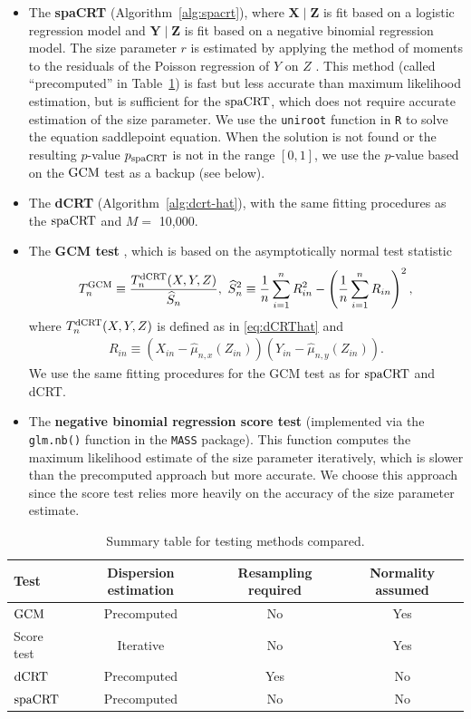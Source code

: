 \documentclass[12pt]{article}
\theoremstyle{definition}
\newcommand{\prx}{\bm X}								%
\newcommand{\srx}{X}									%
\newcommand{\prz}{\bm Z}								%
\newcommand{\srz}{Z}									%
\newcommand{\pry}{{\bm Y}}								%
\newcommand{\sry}{Y}									%
\newcommand{\dCRT}{\textnormal{dCRT}} 					%
\newcommand{\GCM}{\textnormal{GCM}}						%
\newcommand{\spacrt}{\textnormal{spaCRT}}               %
\begin{document}
\begin{itemize}
\item The \textbf{spaCRT} (Algorithm~\ref{alg:spacrt}), where $\prx \mid \prz$ is fit based on a logistic regression model and $\pry \mid \prz$ is fit based on a negative binomial regression model. The size parameter $r$ is estimated by applying the method of moments to the residuals of the Poisson regression of $Y$ on $Z$ \citep{Katsevich2020c,Barry2024}. This method (called ``precomputed'' in Table~\ref{tab:methodology_summary}) is fast but less accurate than maximum likelihood estimation, but is sufficient for the $\spacrt$, which does not require accurate estimation of the size parameter. We use the \texttt{uniroot} function in \texttt{R} to solve the equation saddlepoint equation. When the solution is not found or the resulting $p$-value $p_{\spacrt}$ is not in the range $[0,1]$, we use the $p$-value based on the $\GCM$ test as a backup (see below).
\item The \textbf{dCRT} (Algorithm~\ref{alg:dcrt-hat}), with the same fitting procedures as the $\spacrt$ and $M =$ 10,000.
\item The \textbf{GCM test} \citep{Shah2018}, which is based on the asymptotically normal test statistic
\begin{align*}
	T_n^{\GCM}\equiv\frac{T_n^{\dCRT}(X,Y,Z)}{\widehat{S}_n},\ \widehat{S}_n^2\equiv \frac{1}{n}\sum_{i=1}^n R_{in}^2-\left(\frac{1}{n}\sum_{i=1}^n R_{in}\right)^2,
\end{align*}
where $T_n^{\dCRT}(X,Y,Z)$ is defined as in \eqref{eq:dCRThat} and
\begin{align*}
	R_{in} \equiv (\srx_{in}-\widehat{\mu}_{n,x}(\srz_{in}))(\sry_{in}-\widehat{\mu}_{n,y}(\srz_{in})).
\end{align*}
We use the same fitting procedures for the GCM test as for $\spacrt$ and dCRT.
\item The \textbf{negative binomial regression score test} (implemented via the \verb|glm.nb()| function in the \verb|MASS| package). This function computes the  maximum likelihood estimate of the size parameter iteratively, which is slower than the precomputed approach but more accurate. We choose this approach since the score test relies more heavily on the accuracy of the size parameter estimate.
\end{itemize}

\begin{table}[!h]
  \centering
  \begin{tabular}{l|c|c|c}
  Test & Dispersion estimation & Resampling required & Normality assumed \\
  \hline
  $\GCM$ & Precomputed & No & Yes \\
  Score test & Iterative & No & Yes \\
  $\dCRT$ & Precomputed & Yes & No \\
  $\spacrt$ & Precomputed & No & No
  \end{tabular}
\caption{Summary table for testing methods compared.}
\label{tab:methodology_summary}
\end{table}
\end{document}

